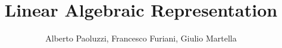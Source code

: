\documentclass[10pt]{book}
\author{Alberto Paoluzzi, Francesco Furiani, Giulio Martella}
\title{Linear Algebraic Representation}
\begin{document}
\frontmatter
\maketitle
\tableofcontents


\mainmatter









\backmatter


{}

\end{document}
